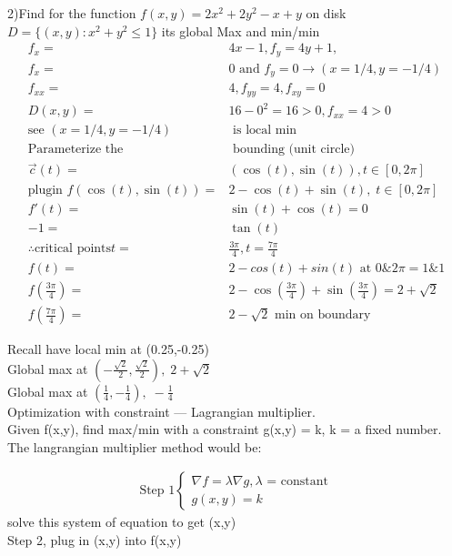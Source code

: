 \documentclass{article}
\begin{document}
        2)Find for the function $f(x,y) = 2x^2 + 2y^2 - x + y$ on disk $D = \{(x,y): x^2 + y^2 \leq 1\}$ its global Max and min/min
        \begin{align}
            f_x =& 4x - 1, f_y = 4y + 1,\\
            f_x =& 0\text{ and }f_y = 0\rightarrow (x=1/4,y=-1/4)\\
            f_{xx} =& 4, f_{yy} = 4, f_{xy} = 0\\
            D(x,y) =& 16-0^2 = 16 > 0, f_{xx} = 4 > 0\\
            \text{see } (x= 1/4, y=-1/4)&\text{ is local min}\\
            \text{Parameterize the } & \text{ bounding (unit circle)}\nonumber\\
            \vec{c}(t) =& (\cos(t),\sin(t)), t\in[0,2\pi]\\
            \text{plugin } f(\cos(t),\sin(t)) =& 2-\cos(t)+\sin(t),\;t\in[0,2\pi]\\
            f'(t) =& \sin(t) + \cos(t) = 0\\
            -1 =& \tan(t)\\
            \therefore \text{critical points} t =& \frac{3\pi}{4}, t = \frac{7\pi}{4}\\
            f(t) =& 2-cos(t) + sin(t)\text{ at } 0 \& 2\pi = 1 \& 1\\
            f(\frac{3\pi}{4}) =& 2-\cos(\frac{3\pi}{4})+\sin(\frac{3\pi}{4})=2+\sqrt{2}\\
            f(\frac{7\pi}{4}) =& 2-\sqrt{2}\text{ min on boundary}
        \end{align}
        
        Recall have local min at (0.25,-0.25)\\
        Global max at $(-\frac{\sqrt{2}}{2},\frac{\sqrt{2}}{2}),\;2+ \sqrt{2}$\\
        Global max at $(\frac{1}{4},-\frac{1}{4}),\;-\frac{1}{4}$\\
        Optimization with constraint --- Lagrangian multiplier.\\
        
        Given f(x,y), find max/min with a constraint g(x,y) = k, k = a fixed number. The langrangian multiplier method would be:
        
        \begin{align}
            \text{Step 1} \begin{cases}
                \nabla f = \lambda \nabla g, \lambda\text{ = constant}\\
                g(x,y) = k
            \end{cases}
        \end{align}
        solve this system of equation to get (x,y)\\
        Step 2, plug in (x,y) into f(x,y)\\
        
\end{document}

